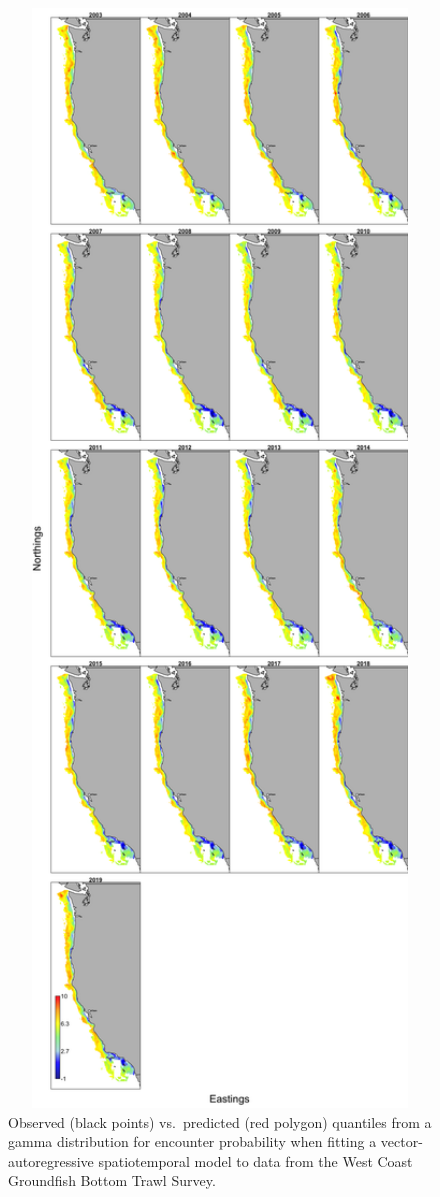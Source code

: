 \documentclass[11pt,
  english,
  a4paper,
]{article}
\begin{document}
\tagmcend\tagstructend


\begin{figure}
\centering
\includegraphics[width=1\textwidth,height=1\textheight]{figs/ln_density-predicted.png}
\caption{Observed (black points) vs.~predicted (red polygon) quantiles from a gamma distribution for encounter probability when fitting a vector-autoregressive spatiotemporal model to data from the West Coast Groundfish Bottom Trawl Survey. \label{fig:surveydensWCGBT1}}
\end{figure}
\end{document}

